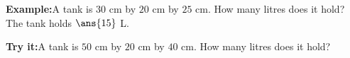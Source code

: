 \documentclass[12pt]{article}
\begin{document}
\begin{examplebox}
\textbf{Example:}\quad A tank is $30$ cm by $20$ cm by $25$ cm. How many litres does it hold?
The tank holds $\ans{15}$ L.
\end{examplebox}

\begin{tryitbox}
\textbf{Try it:}\quad A tank is $50$ cm by $20$ cm by $40$ cm. How many litres
does it hold?\\[2pt]
\end{tryitbox}
\end{document}
